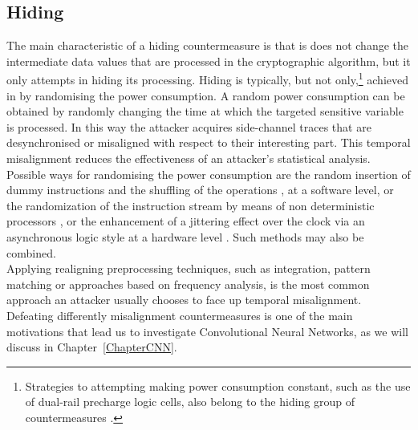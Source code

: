 \subsection{Hiding}
The main characteristic of a hiding countermeasure is that is does not change the intermediate data values that are processed in the cryptographic algorithm, but it only attempts in hiding its processing. Hiding is typically, but not only,\footnote{Strategies to attempting making power consumption constant, such as the use of dual-rail precharge logic cells, also belong to the hiding group of countermeasures \cite{popp2005masked}.} achieved in by randomising the power consumption. A random power consumption can be obtained by randomly changing the time at which the targeted sensitive variable is processed. In this way the attacker acquires side-channel traces that are desynchronised or misaligned with respect to their interesting part. This temporal misalignment reduces the effectiveness of an attacker’s statistical analysis. Possible ways for randomising the power consumption are the random insertion of dummy instructions \cite{coron2009efficient,coron2010analysis} and the shuffling of the operations \cite{veyrat2012shuffling}, at a software level, or the randomization of the instruction stream by means of non deterministic processors \cite{irwin2002instruction,may2001non}, or the enhancement of a jittering effect over the clock via an asynchronous logic style at a hardware level \cite{moore2002improving,moore2003balanced}. Such methods may also be combined. \\

Applying realigning preprocessing techniques, such as integration, pattern matching or approaches based on frequency analysis, is the most common approach an attacker usually chooses to face up temporal misalignment. Defeating differently misalignment countermeasures is one of the main motivations that lead us to investigate Convolutional Neural Networks, as we will discuss in Chapter~\ref{ChapterCNN}.

